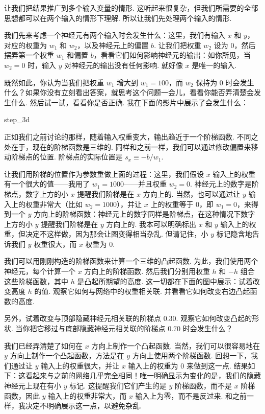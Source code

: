 让我们把结果推广到多个输入变量的情形. 这听起来很复杂，但我们所需要的全部思想都可以在两个输入的情形下理解. 所以让我们先处理两个输入的情形.

我们先来考虑一个神经元有两个输入时会发生什么：这里，我们有输入 $x$ 和 $y$，对应的权重为 $w_1$ 和 $w_2$，以及神经元上的偏置 $b$. 让我们把权重 $w_2$ 设为 $0$，然后摆弄第一个权重 $w_1$ 和偏置 $b$，看看它们如何影响神经元的输出：如你所见，当 $w_2 = 0$ 时，输入 $y$ 对神经元的输出没有任何影响. 就好像 $x$ 是唯一的输入.

既然如此，你认为当我们把权重 $w_1$ 增大到 $w_1 = 100$，而 $w_2$ 保持为 $0$ 时会发生什么？如果你没有立刻看出答案，就思考这个问题一会儿，看看你能否弄清楚会发生什么. 然后试一试，看看你是否正确. 我在下面的影片中展示了会发生什么：

\begin{movieNote}{step\_\allowbreak{}3d}
\end{movieNote}

\noindent 正如我们之前讨论的那样，随着输入权重变大，输出趋近于一个阶梯函数. 不同之处在于，现在的阶梯函数是三维的. 同样和之前一样，我们可以通过修改偏置来移动阶梯点的位置. 阶梯点的实际位置是 $s_x \equiv -b / w_1$.

让我们用阶梯的位置作为参数重做上面的过程：这里，我们假设 $x$ 输入上的权重有一个很大的值——我用了 $w_1 = 1000$——并且权重 $w_2 = 0$. 神经元上的数字是阶梯点，数字上方的小 $x$ 提醒我们阶梯是在 $x$ 方向上的. 当然，也可以通过让 $y$ 输入上的权重非常大（比如 $w_2 = 1000$），并让 $x$ 上的权重等于 $0$，即 $w_1 = 0$，来得到一个 $y$ 方向上的阶梯函数：神经元上的数字同样是阶梯点，在这种情况下数字上方的小 $y$ 提醒我们阶梯是在 $y$ 方向上的. 我本可以明确标出 $x$ 和 $y$ 输入上的权重，但决定不这样做，因为那会让图变得相当杂乱. 但请记住，小 $y$ 标记隐含地告诉我们 $y$ 权重很大，而 $x$ 权重为 $0$.

我们可以用刚刚构造的阶梯函数来计算一个三维的凸起函数. 为此，我们使用两个神经元，每个计算一个 $x$ 方向上的阶梯函数. 然后我们分别用权重 $h$ 和 $-h$ 组合这些阶梯函数，其中 $h$ 是凸起所期望的高度. 这一切都在下面的图中展示：试着改变高度 $h$ 的值. 观察它如何与网络中的权重相关联. 并看看它如何改变右边凸起函数的高度.

另外，试着改变与顶部隐藏神经元相关联的阶梯点 $0.30$. 观察它如何改变凸起的形状. 当你把它移过与底部隐藏神经元相关联的阶梯点 $0.70$ 时会发生什么？

我们已经弄清楚了如何在 $x$ 方向上制作一个凸起函数. 当然，我们可以很容易地在 $y$ 方向上制作一个凸起函数，方法是在 $y$ 方向上使用两个阶梯函数. 回想一下，我们通过让 $y$ 输入上的权重很大，并让 $x$ 输入上的权重为 $0$ 来做到这一点. 结果如下：这看起来与之前的网络几乎完全相同！唯一明确显示为变化的是，我们的隐藏神经元上现在有小 $y$ 标记. 这提醒我们它们产生的是 $y$ 阶梯函数，而不是 $x$ 阶梯函数，因此 $y$ 输入上的权重非常大，而 $x$ 输入上为零，而不是反过来. 和之前一样，我决定不明确展示这一点，以避免杂乱.

